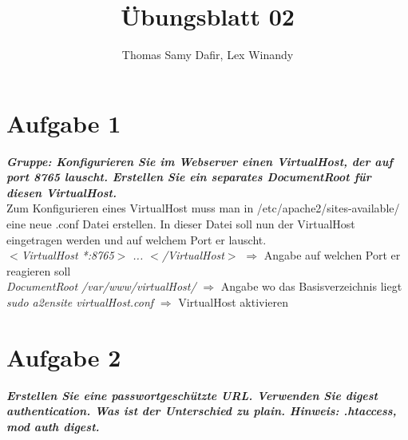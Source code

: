 \documentclass[12pt, a4paper]{report}
\title{Übungsblatt 02}
\author{Thomas Samy Dafir, Lex Winandy}
\date{}
\begin{document}
\maketitle

\section*{Aufgabe 1}
\textbf{\textit{Gruppe: Konfigurieren Sie im Webserver einen VirtualHost, der auf port 8765 lauscht.
Erstellen Sie ein separates DocumentRoot für diesen VirtualHost.}}\\
Zum Konfigurieren eines VirtualHost muss man in /etc/apache2/sites-available/ eine neue .conf Datei erstellen. In dieser Datei soll nun der VirtualHost eingetragen werden und auf welchem Port er lauscht. \\
\textit{$<$VirtualHost *:8765$>$ ... $<$/VirtualHost$>$} $\Rightarrow$ Angabe auf welchen Port er reagieren soll\\
\textit{DocumentRoot /var/www/virtualHost/} $\Rightarrow$ Angabe wo das Basisverzeichnis liegt \\
\textit{sudo a2ensite virtualHost.conf} $\Rightarrow$ VirtualHost aktivieren

\section*{Aufgabe 2}
\textbf{\textit{Erstellen Sie eine passwortgeschützte URL. Verwenden Sie digest authentication. Was ist
der Unterschied zu plain. Hinweis: .htaccess, mod auth digest.}}\\
\end{document}

